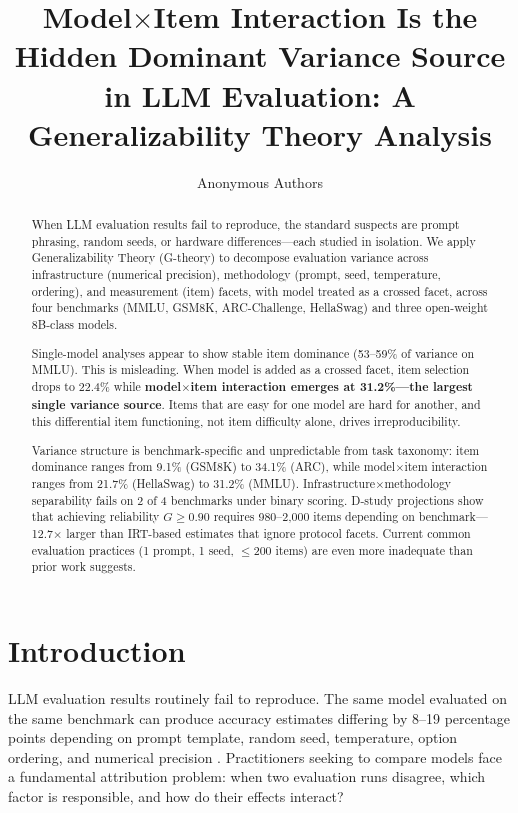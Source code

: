 \documentclass[11pt,twocolumn]{article}
\title{Model$\times$Item Interaction Is the Hidden Dominant Variance Source\\in LLM Evaluation: A Generalizability Theory Analysis}
\author{
  Anonymous Authors
}
\date{}
\newcommand{\Gcoeff}{\ensuremath{G}}
\newcommand{\pct}{\%}
\begin{document}
\maketitle

\begin{abstract}
When LLM evaluation results fail to reproduce, the standard suspects are prompt phrasing, random seeds, or hardware differences---each studied in isolation. We apply Generalizability Theory (G-theory) to decompose evaluation variance across infrastructure (numerical precision), methodology (prompt, seed, temperature, ordering), and measurement (item) facets, with model treated as a crossed facet, across four benchmarks (MMLU, GSM8K, ARC-Challenge, HellaSwag) and three open-weight 8B-class models.

Single-model analyses appear to show stable item dominance (53--59\pct{} of variance on MMLU). This is misleading. When model is added as a crossed facet, item selection drops to 22.4\pct{} while \textbf{model$\times$item interaction emerges at 31.2\pct{}---the largest single variance source}. Items that are easy for one model are hard for another, and this differential item functioning, not item difficulty alone, drives irreproducibility.

Variance structure is benchmark-specific and unpredictable from task taxonomy: item dominance ranges from 9.1\pct{} (GSM8K) to 34.1\pct{} (ARC), while model$\times$item interaction ranges from 21.7\pct{} (HellaSwag) to 31.2\pct{} (MMLU). Infrastructure$\times$methodology separability fails on 2 of 4 benchmarks under binary scoring. D-study projections show that achieving reliability $\Gcoeff \geq 0.90$ requires 980--2{,}000 items depending on benchmark---12.7$\times$ larger than IRT-based estimates that ignore protocol facets. Current common evaluation practices (1 prompt, 1 seed, $\leq$200 items) are even more inadequate than prior work suggests.
\end{abstract}

\section{Introduction}

LLM evaluation results routinely fail to reproduce. The same model evaluated on the same benchmark can produce accuracy estimates differing by 8--19 percentage points depending on prompt template, random seed, temperature, option ordering, and numerical precision \cite{mizrahi2024state,sclar2024quantifying,yuan2025llm}. Practitioners seeking to compare models face a fundamental attribution problem: when two evaluation runs disagree, which factor is responsible, and how do their effects interact?
\end{document}

